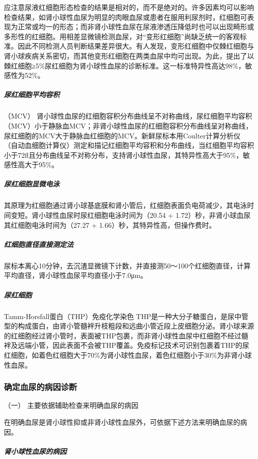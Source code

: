 应注意尿液红细胞形态检查的结果是相对的，而不是绝对的。许多因素均可以影响检查结果，如肾小球性血尿为明显的肉眼血尿或患者在服用利尿剂时，红细胞可表现为正常或均一的形态；而非肾小球性血尿在尿液渗透压降低时也可以出现畸形或多形性的红细胞。用相差显微镜检测血尿，对“变形红细胞”尚缺乏统一的客观标准。因此不同检测人员判断结果差异很大。有人发现，变形红细胞中仅棘红细胞与肾小球疾病关系密切，而其他变形红细胞在两类血尿中均可出现。为此，提出了以棘红细胞≥5\%尿红细胞为肾小球性血尿的诊断标准。这一标准特异性高达98\%，敏感性为52\%。

\subparagraph{尿红细胞平均容积}

（MCV）
肾小球性血尿的红细胞容积分布曲线呈不对称曲线，尿红细胞平均容积（MCV）小于静脉血MCV；非肾小球性血尿的红细胞容积分布曲线呈对称曲线，尿红细胞的MCV大于静脉血红细胞的MCV。新鲜尿标本用Coulter计算分析仪（自动血细胞计算仪）测定和描记红细胞平均容积和分布曲线，当红细胞平均容积小于72fl且分布曲线呈不对称分布，支持肾小球性血尿，其特异性高大于95\%，敏感性高大于95\%。

\subparagraph{尿红细胞显微电泳}

其原理为红细胞通过肾小球基底膜和肾小管后，红细胞表面负电荷减少，其电泳时间变短。肾小球性血尿时尿红细胞电泳时间为（20.54
+ 1.72）秒，非肾小球血尿其红细胞电泳时间为（27.27 +
1.66）秒，其特异性高，但操作费时。

\subparagraph{红细胞直径直接测定法}

尿标本离心10分钟，去沉渣显微镜下计数，并直接测50～100个红细胞直径，计算平均直径，肾小球性血尿平均直径小于7.0μm。

\subparagraph{尿红细胞}

Tamm-Horsfall蛋白（THP）免疫化学染色
THP是一种大分子糖蛋白，是尿中管型的构成蛋白，由肾小管髓袢升枝粗段和远曲小管近段上皮细胞分泌。肾小球来源的红细胞经过肾小管时，表面被THP包裹，而非肾小球性血尿中红细胞不经过髓袢及远端小管，因此表面不会被THP覆盖。免疫标记技术可识别包裹着THP的尿红细胞，如着色红细胞大于70\%为肾小球性血尿，着色红细胞小于30\%为非肾小球性血尿。

\subsubsection{确定血尿的病因诊断}

\hypertarget{text00037.htmlux5cux23CHP1-15-2-4-1}{}
（一） 主要依据辅助检查来明确血尿的病因

在明确血尿是肾小球性抑或非肾小球性血尿外，可依据下述方法来明确血尿的病因。

\subparagraph{肾小球性血尿的病因}

